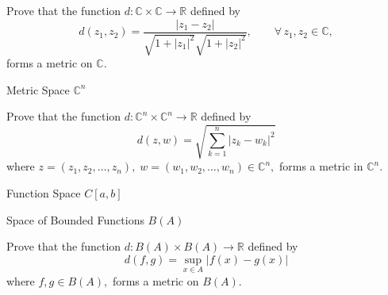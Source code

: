 \documentclass[12pt, a4paper]{article}
\begin{document}
\begin{theorem}
Prove that the function
\(
d : \mathbb{C} \times \mathbb{C} \to \mathbb{R}
\)
defined by
\[
d(z_1,z_2)=\frac{|z_1-z_2|}{\sqrt{1+|z_1|^2}\sqrt{1+|z_2|^2}},
\qquad \forall\, z_1,z_2\in\mathbb{C},
\]
forms a metric on $\mathbb{C}$.
\end{theorem}

\clearpage

\begin{heading}
    Metric Space $\mathbb{C}^n$
\end{heading}

\vspace{10pt}

\begin{theorem}
Prove that the function
\(d : \mathbb{C}^n \times \mathbb{C}^n \to \mathbb{R}\)
defined by
\[
d(z,w)=\sqrt{\sum_{k=1}^{n}|z_k-w_k|^2}\]
where
\( z=(z_1,z_2,\dots,z_n),\;
w=(w_1,w_2,\dots,w_n)\in\mathbb{C}^n,
\)
forms a metric in $\mathbb{C}^n$.
\end{theorem}

\clearpage

\begin{heading}
    Function  Space $C[a,b]$
\end{heading}

\vspace{10pt}


\clearpage


\clearpage

\begin{heading}
    Space of Bounded Functions $B(A)$
\end{heading}

\vspace{10pt}

\begin{theorem}
Prove that the function
\(d : B(A) \times B(A) \to \mathbb{R}\)
defined by
\[d(f,g)=\sup_{x\in A}|f(x)-g(x)|\]
where   \(f,g\in B(A),\)
forms a metric on $B(A)$.
\end{theorem}
\end{document}
